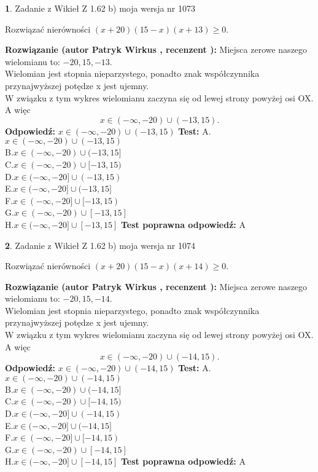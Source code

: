 \documentclass[12pt, a4paper]{article}
\theoremstyle{definition} %
\newtheorem{zad}{}
\newcommand{\zadStart}[1]{\begin{zad}#1\newline}
\newcommand{\zadStop}{\end{zad}}
\newcommand{\rozwStart}[2]{\noindent \textbf{Rozwiązanie (autor #1 , recenzent #2): }\newline}
\newcommand{\rozwStop}{\newline}
\newcommand{\odpStart}{\noindent \textbf{Odpowiedź:}\newline}
\newcommand{\odpStop}{\newline}
\newcommand{\testStart}{\noindent \textbf{Test:}\newline}
\newcommand{\testStop}{\newline}
\newcommand{\kluczStart}{\noindent \textbf{Test poprawna odpowiedź:}\newline}
\newcommand{\kluczStop}{\newline}
\begin{document}
\zadStart{Zadanie z Wikieł Z 1.62 b) moja wersja nr 1073}

Rozwiązać nierówności $(x+20)(15-x)(x+13)\ge0$.
\zadStop
\rozwStart{Patryk Wirkus}{}
Miejsca zerowe naszego wielomianu to: $-20, 15, -13$.\\
Wielomian jest stopnia nieparzystego, ponadto znak współczynnika przy\linebreak najwyższej potędze x jest ujemny.\\ W związku z tym wykres wielomianu zaczyna się od lewej strony powyżej osi OX. A więc $$x \in (-\infty,-20) \cup (-13,15).$$
\rozwStop
\odpStart
$x \in (-\infty,-20) \cup (-13,15)$
\odpStop
\testStart
A.$x \in (-\infty,-20) \cup (-13,15)$\\
B.$x \in (-\infty,-20) \cup (-13,15]$\\
C.$x \in (-\infty,-20) \cup [-13,15)$\\
D.$x \in (-\infty,-20] \cup (-13,15)$\\
E.$x \in (-\infty,-20] \cup (-13,15]$\\
F.$x \in (-\infty,-20] \cup [-13,15)$\\
G.$x \in (-\infty,-20) \cup [-13,15]$\\
H.$x \in (-\infty,-20] \cup [-13,15]$
\testStop
\kluczStart
A
\kluczStop



\zadStart{Zadanie z Wikieł Z 1.62 b) moja wersja nr 1074}

Rozwiązać nierówności $(x+20)(15-x)(x+14)\ge0$.
\zadStop
\rozwStart{Patryk Wirkus}{}
Miejsca zerowe naszego wielomianu to: $-20, 15, -14$.\\
Wielomian jest stopnia nieparzystego, ponadto znak współczynnika przy\linebreak najwyższej potędze x jest ujemny.\\ W związku z tym wykres wielomianu zaczyna się od lewej strony powyżej osi OX. A więc $$x \in (-\infty,-20) \cup (-14,15).$$
\rozwStop
\odpStart
$x \in (-\infty,-20) \cup (-14,15)$
\odpStop
\testStart
A.$x \in (-\infty,-20) \cup (-14,15)$\\
B.$x \in (-\infty,-20) \cup (-14,15]$\\
C.$x \in (-\infty,-20) \cup [-14,15)$\\
D.$x \in (-\infty,-20] \cup (-14,15)$\\
E.$x \in (-\infty,-20] \cup (-14,15]$\\
F.$x \in (-\infty,-20] \cup [-14,15)$\\
G.$x \in (-\infty,-20) \cup [-14,15]$\\
H.$x \in (-\infty,-20] \cup [-14,15]$
\testStop
\kluczStart
A
\kluczStop
\end{document}
